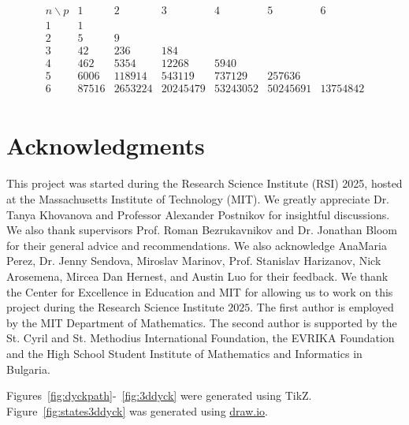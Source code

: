 \documentclass[12pt,notitlepage]{amsart}
\numberwithin{equation}{section}
\theoremstyle{thmstyleone}%
\theoremstyle{thmstyletwo}%
\theoremstyle{thmstylethree}%
\numberwithin{theorem}{section}
\numberwithin{equation}{section}
\begin{document}
\vspace{-1.0 em}
\vspace{-0.8 em}

\begin{table}
\[
\begin{array}{c|ccccccc} 
n \backslash p & 1 & 2 & 3 & 4 & 5 & 6\\
\hline
1 & 1 &  &  &  \\
2 & 5 & 9 &  &  \\
3 & 42 & 236 & 184 &  \\
4 & 462 & 5354 & 12268 & 5940 \\
5 & 6006 & 118914 & 543119 & 737129 & 257636 \\
6 & 87516 & 2653224 & 20245479 & 53243052 & 50245691 & 13754842 \\
\end{array}
\]
\caption{Table of values of $N_{4, p, n}$, the $4$-dimensional Narayana triangle.}
\label{table:4dnarayana}
\end{table}




\section{Acknowledgments}
This project was started during the Research Science Institute (RSI) 2025, hosted at the Massachusetts Institute of Technology (MIT). We greatly appreciate Dr. Tanya Khovanova and Professor Alexander Postnikov for insightful discussions. We also thank supervisors Prof. Roman Bezrukavnikov and Dr. Jonathan Bloom for their general advice and recommendations. We also acknowledge AnaMaria Perez, Dr. Jenny Sendova, Miroslav Marinov, Prof. Stanislav Harizanov, Nick Arosemena, Mircea Dan Hernest, and Austin Luo for their feedback. We thank the Center for Excellence in Education and MIT for allowing us to work on this project during the Research Science Institute $2025$. The first author is employed by the MIT Department of Mathematics. The second author is supported by the St. Cyril and St. Methodius International Foundation, the EVRIKA Foundation and the High School Student Institute of Mathematics and Informatics in Bulgaria.


Figures~\ref{fig:dyckpath}-~\ref{fig:3ddyck} were generated using TikZ. Figure~\ref{fig:states3ddyck} was generated using \href{draw.io}{draw.io}.

\end{document}
